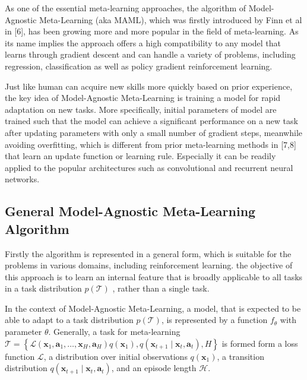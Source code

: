 As one of the essential meta-learning approaches, the algorithm of Model-Agnostic Meta-Learning (aka MAML), which was firstly introduced by Finn et al in [6], has been growing more and more popular in the field of meta-learning. As its name implies the approach offers a high compatibility to any model that learns through gradient descent and can handle a variety of problems, including regression, classification as well as policy gradient reinforcement learning.

Just like human can acquire new skills more quickly based on prior experience, the key idea of Model-Agnostic Meta-Learning is training a model for rapid adaptation on new tasks. More specifically, initial parameters of model are trained such that the model can achieve a significant performance on a new task after updating parameters with only a small number of gradient steps, meanwhile avoiding overfitting, which is different from prior meta-learning methods in [7,8] that learn an update function or learning rule. Especially it can be readily applied to the popular architectures such as convolutional and recurrent neural networks.

\subsection{ General Model-Agnostic Meta-Learning Algorithm}
Firstly the algorithm is represented in a general form, which is suitable for the problems in various domains, including reinforcement learning. the objective of this approach is to learn an internal feature that is broadly applicable to all tasks in a task distribution $p(\mathcal{T})$
, rather than a single task.

In the context of Model-Agnostic Meta-Learning, a model, that is expected to be able to adapt to a task distribution $p(\mathcal{T})$, is represented by a function $f_{\theta}$ with parameter $\theta$. Generally, a task for meta-learning 
$\mathcal{T}=\left\{\mathcal{L}\left(\mathbf{x}_{1}, \mathbf{a}_{1}, \ldots, \mathbf{x}_{H}, \mathbf{a}_{H}\right) q\left(\mathbf{x}_{1}\right), q\left(\mathbf{x}_{t+1} \mid \mathbf{x}_{t}, \mathbf{a}_{t}\right), H\right\}$ is formed form a loss function $\mathcal{L}$, a distribution over initial observations $q\left(\mathbf{x}_{1}\right)$, a transition distribution $q\left(\mathbf{x}_{t+1} \mid \mathbf{x}_{t}, \mathbf{a}_{t}\right)$, and
an episode length $\mathcal{H}$.

